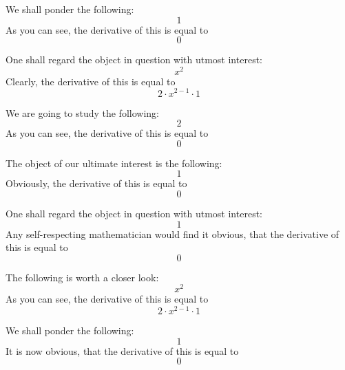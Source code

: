 \documentclass{article}
\begin{document}
We shall ponder the following:
\begin{equation}
1 
\end{equation}
As you can see, the derivative of this is equal to
\begin{equation}
0 
\end{equation}

One shall regard the object in question with utmost interest:
\begin{equation}
x ^{2 } 
\end{equation}
Clearly, the derivative of this is equal to
\begin{equation}
2 \cdot x ^{2 - 1 } \cdot 1 
\end{equation}

We are going to study the following:
\begin{equation}
2 
\end{equation}
As you can see, the derivative of this is equal to
\begin{equation}
0 
\end{equation}

The object of our ultimate interest is the following:
\begin{equation}
1 
\end{equation}
Obviously, the derivative of this is equal to
\begin{equation}
0 
\end{equation}

One shall regard the object in question with utmost interest:
\begin{equation}
1 
\end{equation}
Any self-respecting mathematician would find it obvious, that the derivative of this is equal to
\begin{equation}
0 
\end{equation}

The following is worth a closer look:
\begin{equation}
x ^{2 } 
\end{equation}
As you can see, the derivative of this is equal to
\begin{equation}
2 \cdot x ^{2 - 1 } \cdot 1 
\end{equation}

We shall ponder the following:
\begin{equation}
1 
\end{equation}
It is now obvious, that the derivative of this is equal to
\begin{equation}
0 
\end{equation}
\end{document}
